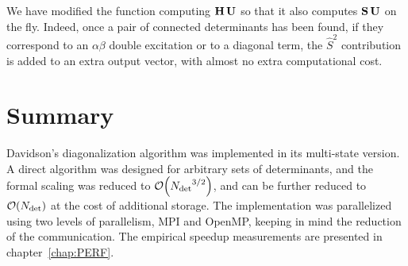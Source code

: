 \documentclass[./thesis.tex]{subfiles}
\begin{document}
We have modified the function computing $\mathbf{H} \, \mathbf{U}$ so that it also computes $\mathbf{S}\, \mathbf{U}$ on the fly.
Indeed, once a pair of connected determinants has been found, if they correspond to an $\alpha \beta$ double excitation or to a diagonal term, the $\hat S^2$ contribution is added to an extra output vector,
with almost no extra computational cost.

\section{Summary}

Davidson's diagonalization algorithm was implemented in its multi-state
version. A direct algorithm was designed for arbitrary sets of determinants, and the
formal scaling was reduced to $\order{\Ndet^{3/2}}$, and can be further reduced to $\order{\Ndet}$
at the cost of additional storage. The implementation was parallelized
using two levels of parallelism, MPI and OpenMP, keeping in mind the reduction
of the communication. The empirical speedup measurements are presented in
chapter~\ref{chap:PERF}.
\end{document}
